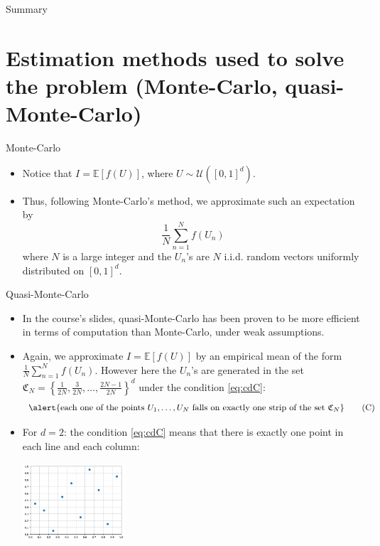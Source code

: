 \documentclass[aspectratio=169,xcolor=dvipsnames]{beamer}
\begin{document}
    \begin{frame}{Summary}
        \tableofcontents
    \end{frame}

    \section{Estimation methods used to solve the problem (Monte-Carlo, quasi-Monte-Carlo)}

    \begin{frame}{Monte-Carlo}
        \begin{itemize}
            \item<1-> Notice that $I = \mathbb{E}[f(U)]$, where $U \sim \mathcal{U}([0, 1]^d)$.

            \item<2-> Thus, following Monte-Carlo's method, we approximate such an expectation by
            \[\frac{1}{N} \sum_{n = 1}^N f(U_n)\]
            where $N$ is a large integer and the $U_n$'s are $N$ i.i.d. random vectors uniformly distributed on $[0, 1]^d$.
        \end{itemize}
    \end{frame}

    \begin{frame}{Quasi-Monte-Carlo}
        \begin{itemize}
            \item<1-> In the course's slides, quasi-Monte-Carlo has been proven to be more efficient in terms of computation than Monte-Carlo, under weak assumptions.

            \item<2-> Again, we approximate $I = \mathbb{E}[f(U)]$ by an empirical mean of the form $\frac{1}{N} \sum_{n = 1}^N f(U_n)$. However here the $U_n$'s are generated in the set $\mathfrak{C}_N = \left\{\frac{1}{2N}, \frac{3}{2N}, \dots, \frac{2N - 1}{2N}\right\}^d$ under the condition \eqref{eq:cdC}:
            \begin{equation}
                \alert{\text{each one of the points } U_1, \dots, U_N \text{ falls on exactly one strip of the set } \mathfrak{C}_N} \tag{C}\label{eq:cdC}
            \end{equation}

            \item<3-> For $d = 2$: the condition \eqref{eq:cdC} means that there is exactly one point in each line and each column:
            \begin{center}
                \includegraphics[width=0.3\textwidth]{points2.png}
            \end{center}
        \end{itemize}
    \end{frame}
\end{document}
